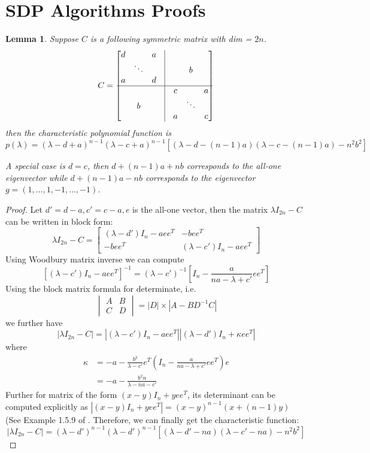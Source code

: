 \documentclass{article}
\newtheorem{lemma}{Lemma}
\begin{document}
	\section{SDP Algorithms Proofs}
\begin{lemma}\label{lem:Cabd}
	Suppose $C$ is a following symmetric matrix with dim = $2n$.
	$$C=\begin{bmatrix} d & \text{ } &  a & \vrule & \text{ } & \text{ }  & \text{ } \\
\text{ } & \ddots & \text{ } & \vrule & \text{ }&  b & \text{ } \\
a & \text{ } & d & \vrule & \text{ } & \text{ } & \text{ } \\ \hline
 \text{ } & \text{ }  & \text{ } & \vrule & c & \text{ } & a \\
 \text{ }& b & \text{ }  & \vrule & \text{ } & \ddots & \text{ } \\
\text{ } & \text{ } & \text{ }& \vrule & a & \text{ } & c \\
\end{bmatrix}$$
then the characteristic polynomial function is
$$
p(\lambda) = 
(\lambda - d + a)^{n-1} (\lambda - c + a)^{n-1}
[(\lambda - d - (n-1)a)
 (\lambda - c - (n-1)a)
- n^2b^2]
$$
 
 A special case is $d=c$, then $d + (n-1)a+ nb$ corresponds to the all-one eigenvector while 
 $d +(n-1)a -nb$ corresponds to the eigenvector $g=(1,\dots, 1, -1, \dots, -1)$.
\end{lemma}
\begin{proof}
Let $d' = d-a, c'=c-a, e$ is the all-one vector,
then the matrix $\lambda I_{2n} - C$ can be written in block form:
$$
\lambda I_{2n} - C = \begin{bmatrix}
(\lambda -d') I_n - a ee^T & -b ee^T \\
-bee^T & (\lambda -c') I_n - a ee^T
\end{bmatrix}
$$
Using Woodbury matrix inverse we can compute
$$
[(\lambda -c') I_n - a ee^T]^{-1} = (\lambda - c')^{-1} [I_n - \frac{a}{na - \lambda + c'} ee^T]
$$
Using the block matrix formula for determinate, i.e.
$$
\begin{vmatrix}
A & B \\
C & D
\end{vmatrix} = |D| \times |A-BD^{-1}C|
$$
we further have
$$
|\lambda I_{2n} - C| = |(\lambda -c') I_n - a ee^T| |(\lambda - d')I_n + \kappa ee^T|
$$
where
\begin{align*}
\kappa &= -a - \frac{b^2}{\lambda - c'} e^T (I_n - \frac{a}{na-\lambda + c'}ee^T)e \\
&= -a  - \frac{b^2 n}{\lambda - na - c'}
\end{align*}
Further for matrix of the form $(x-y)I_n + yee^T$, its determinant can be computed explicitly
as $|(x-y)I_n + yee^T|=(x-y)^{n-1}(x+(n-1)y)$ (See Example 1.5.9 of \cite{ad_li}.
Therefore, we can finally get the characteristic function:
$$
|\lambda I_{2n} - C| = (\lambda -d')^{n-1}(\lambda -d')^{n-1}  [(\lambda - d' - na)(\lambda - c' - na)-n^2b^2]
$$
\end{proof}
\end{document}
